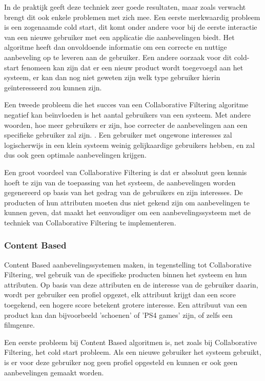In de praktijk geeft deze techniek zeer goede resultaten, maar zoals verwacht brengt dit ook enkele problemen met zich mee. Een eerste merkwaardig probleem is een zogenaamde cold start, dit komt onder andere voor bij de eerste interactie van een nieuwe gebruiker met een applicatie die aanbevelingen biedt. Het algoritme heeft dan onvoldoende informatie om een correcte en nuttige aanbeveling op te leveren aan de gebruiker. Een andere oorzaak voor dit cold-start fenomeen kan zijn dat er een nieuw product wordt toegevoegd aan het systeem, er kan dan nog niet geweten zijn welk type gebruiker hierin geïnteresseerd zou kunnen zijn. 

\newpage
Een tweede probleem die het succes van een Collaborative Filtering algoritme negatief kan beïnvloeden is het aantal gebruikers van een systeem. Met andere woorden, hoe meer gebruikers er zijn, hoe correcter de aanbevelingen aan een specifieke gebruiker zal zijn. \autocite{Sarwar2001}. Een gebruiker met ongewone interesses zal logischerwijs in een klein systeem weinig gelijkaardige gebruikers hebben, en zal dus ook geen optimale aanbevelingen krijgen.

Een groot voordeel van Collaborative Filtering is dat er absoluut geen kennis hoeft te zijn van de toepassing van het systeem, de aanbevelingen worden gegenereerd op basis van het gedrag van de gebruikers en zijn interesses. De producten of hun attributen moeten dus niet gekend zijn om aanbevelingen te kunnen geven, dat maakt het eenvoudiger om een aanbevelingssysteem met de techniek van Collaborative Filtering te implementeren.

\subsubsection{Content Based}
\label{sec:Content Based}

Content Based aanbevelingssystemen \autocite{Lops2011} maken, in tegenstelling tot Collaborative Filtering, wel gebruik van de specifieke producten binnen het systeem en hun attributen. Op basis van deze attributen en de interesse van de gebruiker daarin, wordt per gebruiker een profiel opgezet, elk attribuut krijgt dan een score toegekend, een hogere score betekent grotere interesse. Een attribuut van een product kan dan bijvoorbeeld 'schoenen' of 'PS4 games' zijn, of zelfs een filmgenre.

Een eerste probleem bij Content Based algoritmen is, net zoals bij Collaborative Filtering, het cold start probleem. Als een nieuwe gebruiker het systeem gebruikt, is er voor deze gebruiker nog geen profiel opgesteld en kunnen er ook geen aanbevelingen gemaakt worden.

